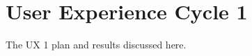 \chapter{User Experience Cycle 1}
\label{ch:ux1-cycle_report}

The UX 1 plan and results discussed here.